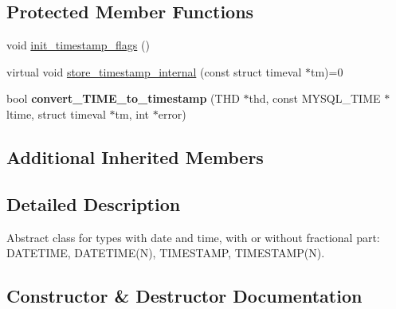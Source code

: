 \subsection*{Protected Member Functions}
\begin{DoxyCompactItemize}
\item 
void \mbox{\hyperlink{classField__temporal__with__date__and__time_ac497834ddc1ef395a387790d97cfb63d}{init\+\_\+timestamp\+\_\+flags}} ()
\item 
virtual void \mbox{\hyperlink{classField__temporal__with__date__and__time_a3cfd6dc59b102362d592341dbf40a19e}{store\+\_\+timestamp\+\_\+internal}} (const struct timeval $\ast$tm)=0
\item 
\mbox{\label{classField__temporal__with__date__and__time_aba7bd4dad14caa217e20ac8a9d6e62a8}} 
bool {\bfseries convert\+\_\+\+T\+I\+M\+E\+\_\+to\+\_\+timestamp} (T\+HD $\ast$thd, const M\+Y\+S\+Q\+L\+\_\+\+T\+I\+ME $\ast$ltime, struct timeval $\ast$tm, int $\ast$error)
\end{DoxyCompactItemize}
\subsection*{Additional Inherited Members}


\subsection{Detailed Description}
Abstract class for types with date and time, with or without fractional part\+: D\+A\+T\+E\+T\+I\+ME, D\+A\+T\+E\+T\+I\+M\+E(\+N), T\+I\+M\+E\+S\+T\+A\+MP, T\+I\+M\+E\+S\+T\+A\+M\+P(\+N). 

\subsection{Constructor \& Destructor Documentation}
\mbox{\label{classField__temporal__with__date__and__time_a60d02d91b14a2b46453e749156f42486}} 
